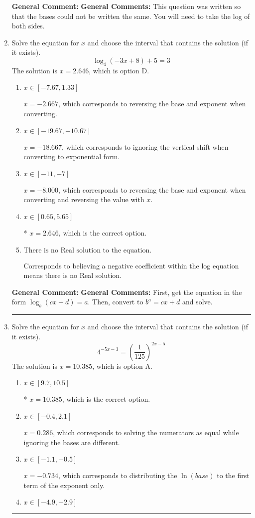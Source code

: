\documentclass{extbook}[14pt]
\newcommand{\litem}[1]{\item #1

\rule{\textwidth}{0.4pt}}
\begin{document}
\begin{enumerate}
{\textbf{General Comment:} \textbf{General Comments:} This question was written so that the bases could not be written the same. You will need to take the log of both sides.
}
\litem{
Solve the equation for $x$ and choose the interval that contains the solution (if it exists).
\[ \log_{4}{(-3x+8)}+5 = 3 \]The solution is \( x = 2.646 \), which is option D.\begin{enumerate}[label=\Alph*.]
\item \( x \in [-7.67, 1.33] \)

$x = -2.667$, which corresponds to reversing the base and exponent when converting.
\item \( x \in [-19.67, -10.67] \)

$x = -18.667$, which corresponds to ignoring the vertical shift when converting to exponential form.
\item \( x \in [-11, -7] \)

$x = -8.000$, which corresponds to reversing the base and exponent when converting and reversing the value with $x$.
\item \( x \in [0.65, 5.65] \)

* $x = 2.646$, which is the correct option.
\item \( \text{There is no Real solution to the equation.} \)

Corresponds to believing a negative coefficient within the log equation means there is no Real solution.
\end{enumerate}

\textbf{General Comment:} \textbf{General Comments:} First, get the equation in the form $\log_b{(cx+d)} = a$. Then, convert to $b^a = cx+d$ and solve.
}
\litem{
Solve the equation for $x$ and choose the interval that contains the solution (if it exists).
\[ 4^{-5x-3} = \left(\frac{1}{125}\right)^{2x-5} \]The solution is \( x = 10.385 \), which is option A.\begin{enumerate}[label=\Alph*.]
\item \( x \in [9.7, 10.5] \)

* $x = 10.385$, which is the correct option.
\item \( x \in [-0.4, 2.1] \)

$x = 0.286$, which corresponds to solving the numerators as equal while ignoring the bases are different.
\item \( x \in [-1.1, -0.5] \)

$x = -0.734$, which corresponds to distributing the $\ln(base)$ to the first term of the exponent only.
\item \( x \in [-4.9, -2.9] \)


\end{enumerate}}
\end{enumerate}
\end{document}

